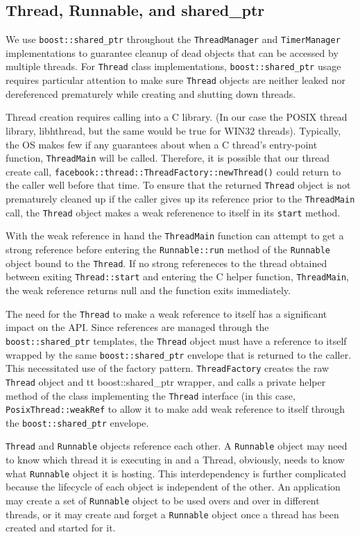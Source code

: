 \documentclass[nocopyrightspace,blockstyle]{sigplanconf}
\begin{document}
\subsection{Thread, Runnable, and shared\_ptr}
We use {\tt boost::shared\_ptr} throughout the {\tt ThreadManager} and
{\tt TimerManager} implementations to guarantee cleanup of dead objects that can
be accessed by multiple threads.  For {\tt Thread} class implementations,
{\tt boost::shared\_ptr} usage requires particular attention to make sure
{\tt Thread} objects are neither leaked nor dereferenced prematurely while
creating and shutting down threads.

Thread creation requires calling into a C library.  (In our case the POSIX
thread library, libhthread, but the same would be true for WIN32 threads).
Typically, the OS makes few if any guarantees about when a C thread's
entry-point function, {\tt ThreadMain} will be called.  Therefore, it is
possible that our thread create call,
{\tt facebook::thread::ThreadFactory::newThread()} could return to the caller
well before that time.  To ensure that the returned {\tt Thread} object is not
prematurely cleaned up if the caller gives up its reference prior to the
{\tt ThreadMain} call, the {\tt Thread} object makes a weak referenence to
itself in its {\tt start} method.

With the weak reference in hand the {\tt ThreadMain} function can attempt to get
a strong reference before entering the {\tt Runnable::run} method of the
{\tt Runnable} object bound to the {\tt Thread}.  If no strong refereneces to the
thread obtained between exiting {\tt Thread::start} and entering the C helper
function,  {\tt ThreadMain}, the weak reference returns null and the function 
exits immediately.

The need for the {\tt Thread} to make a weak reference to itself has a
significant impact on the API.  Since references are managed through the
{\tt boost::shared\_ptr} templates, the {\tt Thread} object must have a reference
to itself wrapped by the same {\tt boost::shared\_ptr} envelope that is returned
to the caller.  This necessitated use of the factory pattern.
{\tt ThreadFactory} creates the raw {\tt Thread} object and
{tt boost::shared\_ptr} wrapper, and calls a private helper method of the class
implementing the {\tt Thread} interface (in this case, {\tt PosixThread::weakRef}
 to allow it to make add weak reference to itself through the
 {\tt boost::shared\_ptr} envelope.

{\tt Thread} and {\tt Runnable} objects reference each other.  A {\tt Runnable}
object may need to know which thread it is executing in and a Thread, obviously,
needs to know what {\tt Runnable} object it is hosting.  This interdependency is
further complicated because the lifecycle of each object is independent of the
other.  An application may create a set of {\tt Runnable} object to be used overs
and over in different threads, or it may create and forget a {\tt Runnable} object
once a thread has been created and started for it. 
\end{document}
